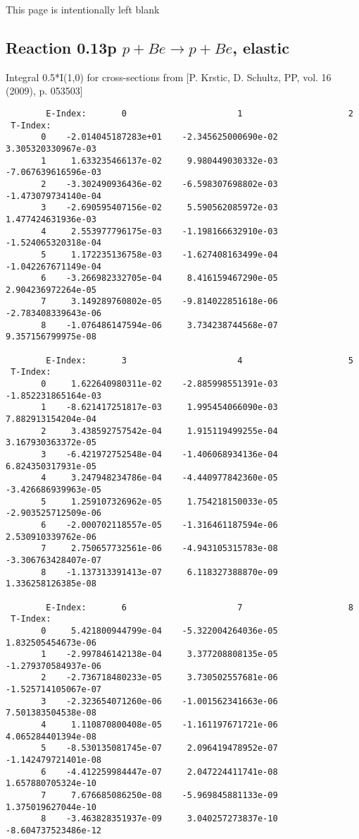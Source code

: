 \documentclass[12pt,dvipdfmx]{article}
\begin{document}
{\begin{small}
\begin{verbatim}
\end{verbatim}\end{small}
\newpage
This page is intentionally left blank
\newpage

\subsection{
Reaction 0.13p  $p + Be \rightarrow p + Be$, elastic}

Integral 0.5*I(1,0) for cross-sections from [P. Krstic, D. Schultz, PP, vol. 16 (2009), p. 053503]

\begin{small}\begin{verbatim}
        E-Index:       0                      1                     2
 T-Index:
       0    -2.014045187283e+01    -2.345625000690e-02     3.305320330967e-03
       1     1.633235466137e-02     9.980449030332e-03    -7.067639616596e-03
       2    -3.302490936436e-02    -6.598307698802e-03    -1.473079734140e-04
       3    -2.690595407156e-02     5.590562085972e-03     1.477424631936e-03
       4     2.553977796175e-03    -1.198166632910e-03    -1.524065320318e-04
       5     1.172235136758e-03    -1.627408163499e-04    -1.042267671149e-04
       6    -3.266982332705e-04     8.416159467290e-05     2.904236972264e-05
       7     3.149289760802e-05    -9.814022851618e-06    -2.783408339643e-06
       8    -1.076486147594e-06     3.734238744568e-07     9.357156799975e-08

        E-Index:       3                      4                     5
 T-Index:
       0     1.622640980311e-02    -2.885998551391e-03    -1.852231865164e-03
       1    -8.621417251817e-03     1.995454066090e-03     7.882913154204e-04
       2     3.438592757542e-04     1.915119499255e-04     3.167930363372e-05
       3    -6.421972752548e-04    -1.406068934136e-04     6.824350317931e-05
       4     3.247948234786e-04    -4.440977842360e-05    -3.426686939963e-05
       5     1.259107326962e-05     1.754218150033e-05    -2.903525712509e-06
       6    -2.000702118557e-05    -1.316461187594e-06     2.530910339762e-06
       7     2.750657732561e-06    -4.943105315783e-08    -3.306763428407e-07
       8    -1.137313391413e-07     6.118327388870e-09     1.336258126385e-08

        E-Index:       6                      7                     8
 T-Index:
       0     5.421800944799e-04    -5.322004264036e-05     1.832505454673e-06
       1    -2.997846142138e-04     3.377208808135e-05    -1.279370584937e-06
       2    -2.736718480233e-05     3.730502557681e-06    -1.525714105067e-07
       3    -2.323654071260e-06    -1.001562341663e-06     7.501383504538e-08
       4     1.110870800408e-05    -1.161197671721e-06     4.065284401394e-08
       5    -8.530135081745e-07     2.096419478952e-07    -1.142479721401e-08
       6    -4.412259984447e-07     2.047224411741e-08     1.657880705324e-10
       7     7.676685086250e-08    -5.969845881133e-09     1.375019627044e-10
       8    -3.463828351937e-09     3.040257273837e-10    -8.604737523486e-12


\end{verbatim}
\end{small}}
\end{document}
